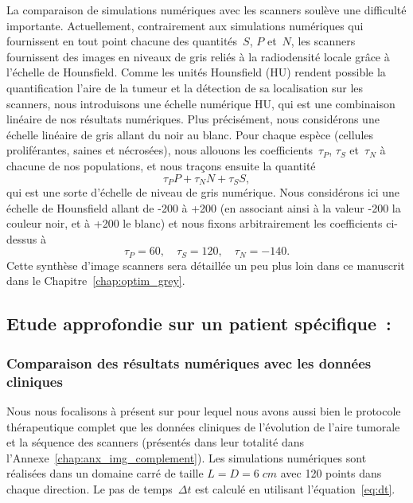 \documentclass[main.tex]{subfiles}
\begin{document}
La comparaison de simulations numériques 
avec les scanners soulève une difficulté importante. 
Actuellement, contrairement aux simulations numériques qui fournissent en tout point chacune des quantités~$S$, $P$ et~$N$, les scanners fournissent des images en niveaux de gris reliés à la radiodensité locale grâce à l'échelle de 
Hounsfield. Comme les unités Hounsfield (HU) rendent possible la quantification  
l'aire de la tumeur et la détection de sa localisation sur les scanners, nous introduisons une échelle numérique HU, qui est une combinaison linéaire de nos résultats numériques. 
Plus précisément, nous considérons une échelle linéaire de gris allant du noir au blanc. Pour chaque espèce (cellules proliférantes, saines et nécrosées), nous allouons les 
coefficients~$\tau_P$, $\tau_S$ et~$\tau_N$ à chacune de nos populations, et nous traçons ensuite la quantité
\begin{equation}\label{eq:grey_level}
\tau_P P + \tau_N N + \tau_S S,
\end{equation}
qui est une sorte d'échelle de niveau de gris numérique. 
Nous considérons ici une échelle de Hounsfield allant de 
-200 à +200 (en associant ainsi à la valeur -200 la couleur noir, et à +200 le blanc) et nous fixons arbitrairement les coefficients ci-dessus à 
\begin{equation}\label{eq:tau_arbitraire}
\tau_P=60,\quad \tau_S=120,\quad \tau_N=-140.
\end{equation}
Cette synthèse d'image scanners sera détaillée un peu plus loin dans ce manuscrit dans le Chapitre~\ref{chap:optim_grey}.


\subsection{Etude approfondie sur un patient spécifique~: \Nber}
\subsubsection{Comparaison des résultats numériques avec les données cliniques}
Nous nous focalisons à présent sur \Nber pour lequel nous avons aussi bien le protocole thérapeutique complet que les données cliniques de l'évolution de l'aire tumorale et la séquence des scanners (présentés dans leur totalité dans l'Annexe~\ref{chap:anx_img_complement}). 
Les simulations numériques sont réalisées dans un domaine carré de taille 
$L=D=6\;cm$ avec 120 points dans chaque direction. 
Le pas de temps~$\Delta t$ est calculé en utilisant l'équation~\eqref{eq:dt}. 
\end{document}
